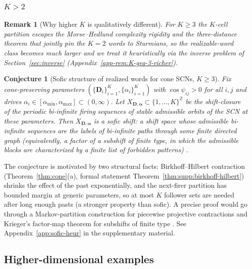 \documentclass[12pt]{article}
\newcommand{\vv}[1]{\mathbf{#1}}
\newcommand{\DD}{\vv{D}}
\newtheorem{remark}{Remark}
\newtheorem{conjecture}{Conjecture}
\begin{document}
\subsubsection{$K>2$}

\begin{remark}[Why higher $K$ is qualitatively different]\label{rem:K-geq-3-richer} For $K\geq 3$ the $K$-cell partition escapes the Morse--Hedlund complexity rigidity \citep{morse1938symbolic,morse1940symbolic} and the three-distance theorem \citep{sos1958distribution,swierczkowski1958successive} that jointly pin the $K=2$ words to Sturmians, so the realizable-word class becomes much larger and we treat it heuristically via the inverse problem of Section~\ref{sec:inverse} (Appendix~\ref{app-rem:K-geq-3-richer}). \end{remark}

\begin{conjecture}[Sofic structure of realized words for cone SCNs, $K\geq 3$]\label{conj:sofic}
Fix cone-preserving parameters $(\{\DD_i\}_{i=1}^K, \{\alpha_i\}_{i=1}^K)$ with $\cos\psi_{ij}>0$ for all $i,j$ and drives $\alpha_i\in[\alpha_{\min},\alpha_{\max}]\subset(0,\infty)$. Let $X_{\vv{D},\boldsymbol{\alpha}}\subset\{1,\ldots,K\}^{\mathbb{Z}}$ be the shift-closure of the periodic bi-infinite firing sequences of stable admissible orbits of the SCN at these parameters. Then $X_{\vv{D},\boldsymbol{\alpha}}$ is a \emph{sofic shift}: a shift space whose admissible bi-infinite sequences are the labels of bi-infinite paths through some finite directed graph (equivalently, a factor of a \emph{subshift of finite type}, in which the admissible blocks are characterized by a finite list of forbidden patterns) \citep{lind2021introduction}.
\end{conjecture}

The conjecture is motivated by two structural facts: Birkhoff--Hilbert contraction (Theorem~\ref{thm:cone}(a), formal statement Theorem~\ref{thm:supp:birkhoff-hilbert}) shrinks the effect of the past exponentially, and the next-firer partition has bounded margin at generic parameters, so at most $K$ follower sets are needed after long enough pasts (a stronger property than sofic). A precise proof would go through a Markov-partition construction for piecewise projective contractions and Krieger's factor-map theorem for subshifts of finite type \citep{lind2021introduction}. See Appendix~\ref{app:sofic-heur} in the supplementary material.
\subsection{Higher-dimensional examples}\label{sec:highd}
\end{document}
